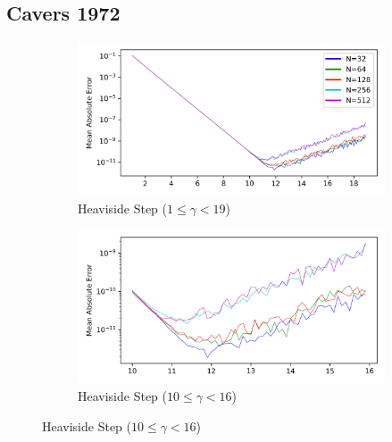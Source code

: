 \documentclass[a4paper]{report}
\begin{document}
\subsection{Cavers 1972}
\begin{figure}[H]
    \begin{subfigure}{.45\linewidth}
      \includegraphics[width=\linewidth]{images/cavers/heaviside_2N.png}
      \caption{Heaviside Step ($1 \leq \gamma < 19$)}
    \end{subfigure}\hfill
    \begin{subfigure}{.45\linewidth}
      \includegraphics[width=\linewidth]{images/cavers/heaviside_zoomed_2N.png}
      \caption{Heaviside Step ($10 \leq \gamma < 16$)}
      \label{fig:heaviside_zoomed}
    \end{subfigure}
    
    \medskip
    

\end{figure}
\end{document}
